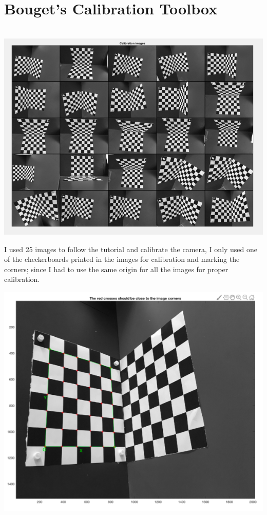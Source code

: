 \documentclass[]{article}
\begin{document}
\section{Bouget's Calibration Toolbox}\
\includegraphics{uncalibrated_images.png}

I used 25 images to follow the tutorial and calibrate the camera, I only used one of the checkerboards printed in the images for calibration and marking the corners; since I had to use the same origin for all the images for proper calibration.

 
\includegraphics{calibrated_1.png}
\end{document}
